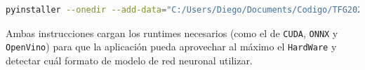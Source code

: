 \begin{lstlisting}[language=bash,breaklines=true]
    pyinstaller --onedir --add-data="C:/Users/Diego/Documents/Codigo/TFG2024/.venv/Lib/site-packages/ultralytics":"ultralytics/" --add-binary="C:/Users/Diego/Documents/Codigo/TFG2024/.venv/Lib/site-packages/openvino/libs":"." --hidden-import openvino --collect-submodules openvino --collect-binaries openvino --collect-data openvino --hidden-import onnx --hidden-import onnxruntime  .\main.py
\end{lstlisting}

Ambas instrucciones cargan los runtimes necesarios (como el de \texttt{CUDA}, \texttt{ONNX} y \texttt{OpenVino}) para que la aplicación pueda aprovechar al máximo el \texttt{HardWare} y detectar cuál formato de 
modelo de red neuronal utilizar.